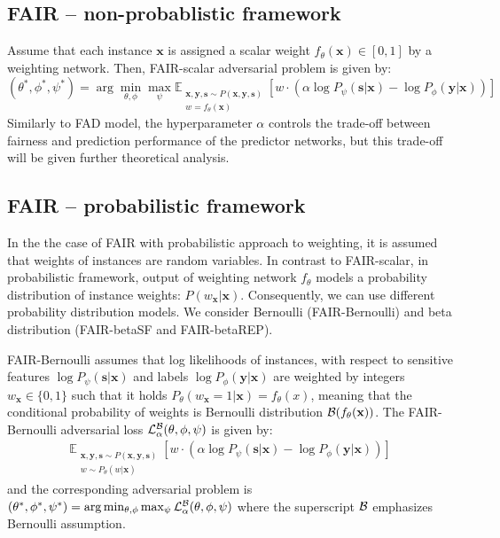 \documentclass[preprint,12pt]{elsarticle}
\begin{document}
\subsection{FAIR -- non-probablistic framework}
Assume that each instance $\mathbf{x}$ is assigned a scalar weight $f_\theta(\mathbf{x})\in[0,1]$ by a weighting network. Then, FAIR-scalar adversarial problem is given by:
\begin{equation}
\label{Eq:Loss-scalar}
(\theta^*,\phi^*,\psi^*) = \arg\min_{\theta,\phi}\max_{\psi}\mathbb{E}_{\substack{\mathbf{x},\mathbf{y},\mathbf{s} \sim P(\mathbf{x},\mathbf{y},\mathbf{s})\\w=f_\theta(\mathbf{x})}} [w \cdot(\alpha\log P_{\psi}(\mathbf{s}|\mathbf{x})
- \log P_{\phi}(\mathbf{y}|\mathbf{x}))]
\end{equation}
Similarly to FAD model, the hyperparameter $\alpha$ controls the trade-off between fairness and prediction performance of the predictor networks, but this trade-off will be given further theoretical analysis.


\subsection{FAIR -- probabilistic framework}
\label{Sec:FAD-pf}
In the the case of FAIR with probabilistic approach to weighting, it is assumed that  weights of instances are random variables. In contrast to FAIR-scalar, in probabilistic framework, output of weighting network $f_\theta$ models a probability distribution of instance weights: $P(w_\mathbf{x}|\mathbf{x})$. Consequently, we can use different probability distribution models. We consider Bernoulli (FAIR-Bernoulli) and beta distribution (FAIR-betaSF and FAIR-betaREP).

FAIR-Bernoulli assumes that log likelihoods of instances, with respect to sensitive features $\log P_{\psi}(\mathbf{s}|\mathbf{x})$ and labels $\log P_{\phi}(\mathbf{y}|\mathbf{x})$ are weighted by integers $w_\mathbf{x} \in \{0,1\}$ such that it holds $P_\theta(w_\mathbf{x}=1|\mathbf{x})=f_\theta(x)$, meaning that the conditional probability of weights is Bernoulli distribution ${\cal B}(f_\theta(\mathbf{x}))$. The FAIR-Bernoulli adversarial loss ${\cal L}^{\cal B}_{\alpha}(\theta, \phi, \psi)$ is given by:
\begin{gather}
\label{Eq:Loss_prob}
\mathbb{E}_{\substack{\mathbf{x},\mathbf{y}, \mathbf{s} \sim P\left(\mathbf{x},\mathbf{y}, \mathbf{s}\right)\\w \sim P_\theta(w|\mathbf{x})}}  \left[ w \cdot(\alpha\log P_{\psi}\left(\mathbf{s}|\mathbf{x}\right)
-  \log P_{\phi}\left(\mathbf{y}|\mathbf{x}\right))\right]
\end{gather}
and the corresponding adversarial problem is $(\theta^*,\phi^*,\psi^*) = \arg\min_{\theta,\phi}\max_{\psi}{\cal L}^{\cal B}_\alpha(\theta,\phi,\psi)$
where the superscript ${\cal B}$ emphasizes Bernoulli assumption.
\end{document}
